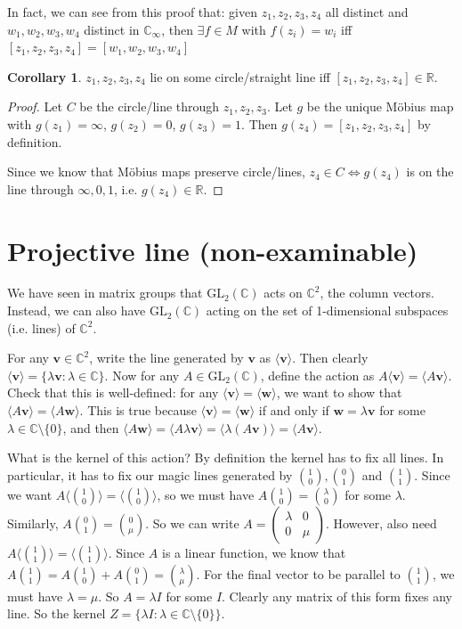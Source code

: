 \documentclass[a4paper]{article}
\theoremstyle{definition}
\newtheorem*{cor}{Corollary}
\newcommand{\mb}[1]{\mathbf{#1}}
\newcommand{\R}{\mathbb{R}}
\newcommand{\C}{\mathbb{C}}
\newcommand{\bra}{\langle}
\newcommand{\ket}{\rangle}
\newcommand{\GL}{\mathrm{GL}}
\let\stdsection\section
\renewcommand\section{\newpage\stdsection}
\begin{document}
In fact, we can see from this proof that: given $z_1, z_2, z_3, z_4$ all distinct and $w_1, w_2, w_3, w_4$ distinct in $\C_\infty$, then $\exists f\in M$ with $f(z_i) = w_i$ iff $[z_1, z_2, z_3, z_4] = [w_1, w_2, w_3, w_4]$

\begin{cor}
  $z_1, z_2, z_3, z_4$ lie on some circle/straight line iff $[z_1, z_2, z_3, z_4]\in \R$.
\end{cor}

\begin{proof}
  Let $C$ be the circle/line through $z_1, z_2, z_3$. Let $g$ be the unique M\"obius map with $g(z_1) = \infty$, $g(z_2) = 0$, $g(z_3) = 1$. Then $g(z_4) = [z_1, z_2, z_3, z_4]$ by definition.

  Since we know that M\"obius maps preserve circle/lines, $z_4\in C \Leftrightarrow g(z_4)$ is on the line through $\infty, 0, 1$, i.e. $g(z_4) \in \R$.
\end{proof}

\section{Projective line (non-examinable)}
We have seen in matrix groups that $\GL_2(\C)$ acts on $\C^2$, the column vectors. Instead, we can also have $\GL_2(\C)$ acting on the set of 1-dimensional subspaces (i.e. lines) of $\C^2$.

For any $\mb{v}\in \C^2$, write the line generated by $\mb{v}$ as $\bra \mb{v}\ket$. Then clearly $\bra \mb{v} \ket = \{\lambda \mb{v}: \lambda\in \C\}$. Now for any $A\in \GL_2(\C)$, define the action as $A\bra \mb{v}\ket = \bra A\mb{v}\ket$. Check that this is well-defined: for any $\bra \mb{v} \ket = \bra \mb{w}\ket$, we want to show that $\bra A\mb{v}\ket = \bra A\mb{w}\ket$. This is true because $\bra \mb{v} \ket = \bra \mb{w}\ket$ if and only if $\mb{w} = \lambda \mb{v}$ for some $\lambda\in \C\setminus\{0\}$, and then $\bra A\mb{w}\ket = \bra A\lambda\mb{v}\ket = \bra \lambda (A\mb{v})\ket = \bra A\mb{v}\ket$.

What is the kernel of this action? By definition the kernel has to fix all lines. In particular, it has to fix our magic lines generated by ${1\choose 0}, {0\choose 1}$ and ${1\choose 1}$. Since we want $A\bra {1\choose 0}\ket = \bra {1\choose 0}\ket$, so we must have $A{1\choose 0} = {\lambda \choose 0}$ for some $\lambda$. Similarly, $A{0\choose 1} = {0\choose \mu}$. So we can write $A = 
\begin{pmatrix}
  \lambda & 0\\
  0 & \mu
\end{pmatrix}$. However, also need $A\bra {1\choose 1}\ket = \bra{1\choose 1}\ket$. Since $A$ is a linear function, we know that $A {1\choose 1} = A {1\choose 0} + A {0\choose 1} = {\lambda \choose \mu}$. For the final vector to be parallel to ${1\choose 1}$, we must have $\lambda = \mu$. So $A = \lambda I$ for some $I$. Clearly any matrix of this form fixes any line. So the kernel $Z = \{\lambda I: \lambda\in \C\setminus\{0\}\}$.
\end{document}
